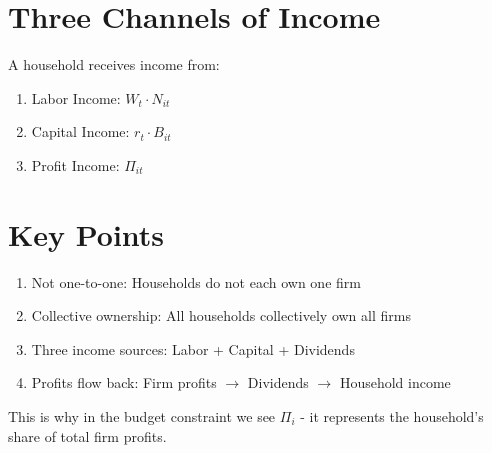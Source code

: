 \documentclass[12pt,a4paper]{article}
\begin{document}
\section{Three Channels of Income}

A household receives income from:
\begin{enumerate}
    \item Labor Income: $W_t \cdot N_{it}$
    \item Capital Income: $r_t \cdot B_{it}$
    \item Profit Income: $\Pi_{it}$
\end{enumerate}

\section{Key Points}

\begin{enumerate}
    \item Not one-to-one: Households do not each own one firm
    \item Collective ownership: All households collectively own all firms
    \item Three income sources: Labor + Capital + Dividends
    \item Profits flow back: Firm profits $\rightarrow$ Dividends $\rightarrow$ Household income
\end{enumerate}

This is why in the budget constraint we see $\Pi_i$ - it represents the household's share of total firm profits.
\end{document}
